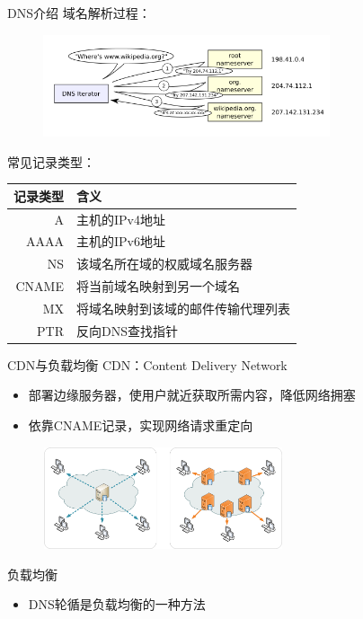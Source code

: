 \documentclass{beamer}
\begin{document}
\begin{frame}{DNS介绍}
  域名解析过程：
  \begin{figure}
  \includegraphics[height=3cm,width=8.455cm]{images/Example_of_an_iterative_DNS_resolver.png}
  \end{figure}

  常见记录类型：
  \begin{table}
    \scriptsize
  \begin{tabular}{r|l}
    \toprule
    记录类型& 含义\\
    \midrule
    A& 主机的IPv4地址\\
    AAAA& 主机的IPv6地址\\
    NS& 该域名所在域的权威域名服务器\\
    CNAME& 将当前域名映射到另一个域名\\
    MX & 将域名映射到该域的邮件传输代理列表 \\
    PTR&反向DNS查找指针\\
    \bottomrule
    \end{tabular}
  \end{table}
\end{frame}

\begin{frame}{CDN与负载均衡}
  CDN：Content Delivery Network
  \begin{itemize}
    \item 部署边缘服务器，使用户就近获取所需内容，降低网络拥塞
    \item 依靠CNAME记录，实现网络请求重定向
  \end{itemize}
  \begin{figure}
  \includegraphics[height=3cm,width=7.07cm]{images/NCDNCDN.png}
  \end{figure}

  负载均衡
  \begin{itemize}
    \item DNS轮循是负载均衡的一种方法
  \end{itemize}
\end{frame}
\end{document}
